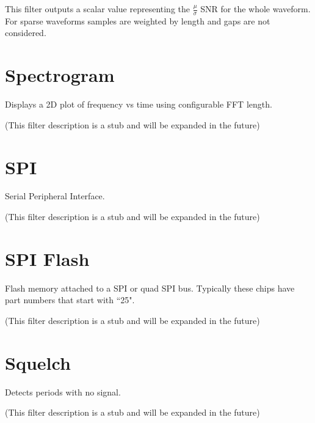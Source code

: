 This filter outputs a scalar value representing the $\frac{\mu}{\sigma}$ SNR for the whole waveform. For sparse
waveforms samples are weighted by length and gaps are not considered.

\pagebreak
\section{Spectrogram}

Displays a 2D plot of frequency vs time using configurable FFT length.

(This filter description is a stub and will be expanded in the future)

\pagebreak
\section{SPI}

Serial Peripheral Interface.

(This filter description is a stub and will be expanded in the future)

\pagebreak
\section{SPI Flash}

Flash memory attached to a SPI or quad SPI bus. Typically these chips have part numbers that start with ``25".

(This filter description is a stub and will be expanded in the future)

\pagebreak
\section{Squelch}

Detects periods with no signal.

(This filter description is a stub and will be expanded in the future)

\pagebreak
